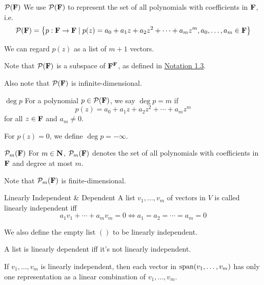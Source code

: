 \documentclass[12pt,a4paper]{article}
\begin{document}
    \begin{notation}{$\mathcal{P}(\mathbf{F})$}
        We use $\mathcal{P}(\mathbf{F})$ to represent the set of all polynomials with coefficients in $\mathbf{F}$, i.e.
        $$\mathcal{P}(\mathbf{F})=\left\{p:\mathbf{F}\to\mathbf{F}\mid p(z)=a_0+a_1z+a_2z^2+\cdots+a_mz^m,a_0,\dots,a_m\in\mathbf{F}\right\}$$
    \end{notation}
    \begin{remark}
        We can regard $p(z)$ as a list of $m+1$ vectors.
    \end{remark}
    \begin{remark}
        Note that $\mathcal{P}(\mathbf{F})$ is a subspace of $\mathbf{F}^{\mathbf{F}}$, as defined in \hyperref[1.3]{Notation 1.3}.
    \end{remark}
    \begin{remark}
        Also note that $\mathcal{P}(\mathbf{F})$ is infinite-dimensional. 
    \end{remark}
    \hfill

    \begin{notation}{$\deg p$}
        For a polynomial $p\in\mathcal{P}(\mathbf{F})$, we say $\deg p=m$ if $$p(z)=a_0+a_1z+a_2z^2+\cdots+a_mz^m$$ for all $z\in\mathbf{F}$ and $a_m\not=0$.

        For $p(z)=0$, we define $\deg p=-\infty$.
    \end{notation}
    \hfill

    \begin{notation}{$\mathcal{P}_m(\mathbf{F})$}
        For $m\in\mathbf{N}$, $\mathcal{P}_m(\mathbf{F})$ denotes the set of all polynomials with coefficients in $\mathbf{F}$ and degree at most $m$.
    \end{notation}
    \begin{remark}
        Note that $\mathcal{P}_m(\mathbf{F})$ is finite-dimensional.
    \end{remark}
    \hfill

    \begin{defi}{Linearly Independent \& Dependent}
        A list $v_1,\dots,v_m$ of vectors in $V$ is called linearly independent iff 
        $$
        a_1v_1+\cdots+a_mv_m=0\iff a_1=a_2=\cdots=a_m=0
        $$
        
        We also define the empty list $()$ to be linearly independent.
        \vspace{1em}
        
        A list is linearly dependent iff it's not linearly independent.
    \end{defi}
    \begin{remark}
        If $v_1,\dots,v_m$ is linearly independent, then each vector in $\operatorname{span}(v_1,\dots,v_m)$ has only one representation as a linear combination of $v_1,\dots,v_m$.
    \end{remark}
    \hfill
\end{document}
